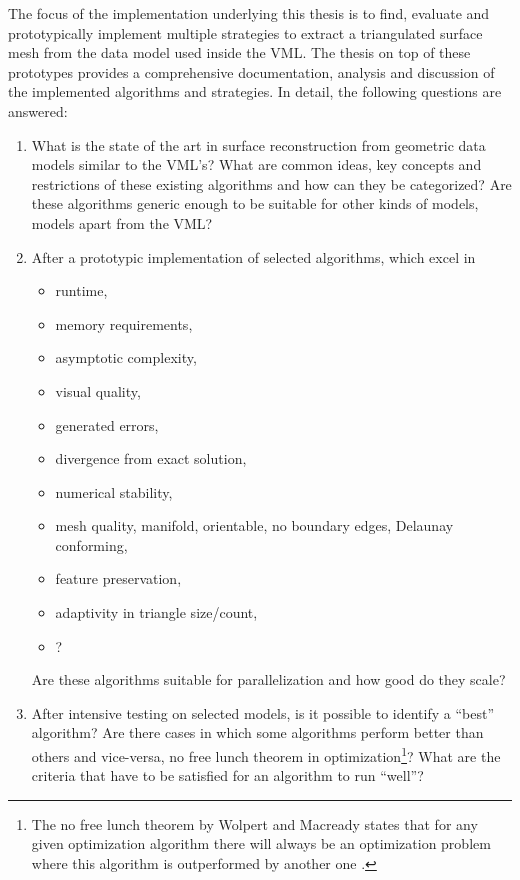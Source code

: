 The focus of the implementation underlying this thesis is to find, evaluate and prototypically implement multiple strategies to extract a triangulated surface mesh from the data model used inside the VML.
The thesis on top of these prototypes provides a comprehensive documentation, analysis and discussion of the implemented algorithms and strategies.
In detail, the following questions are answered:

\begin{enumerate}
	\item What is the state of the art in surface reconstruction from geometric data models similar to the VML's?
	What are common ideas, key concepts and restrictions of these existing algorithms and how can they be categorized?
	Are these algorithms generic enough to be suitable for other kinds of models, \ie models apart from the VML?

	\item After a prototypic implementation of selected algorithms, which excel in
	\begin{itemize}
		\item runtime,
		\item memory requirements,
		\item asymptotic complexity,
		\item visual quality,
		\item generated errors,
		\item divergence from exact solution,
		\item numerical stability,
		\item mesh quality, \eg manifold, orientable, no boundary edges, Delaunay conforming,
		\item feature preservation,
		\item adaptivity in triangle size/count,
		\item \etc?
	\end{itemize}
	Are these algorithms suitable for parallelization and how good do they scale?

	\item After intensive testing on selected models, is it possible to identify a \enquote{best} algorithm?
	Are there cases in which some algorithms perform better than others and vice-versa, \cf no free lunch theorem in optimization\footnote{The no free lunch theorem by Wolpert and Macready states that for any given optimization algorithm there will always be an optimization problem where this algorithm is outperformed by another one \cite{no_free_lunch}.}?
	What are the criteria that have to be satisfied for an algorithm to run \enquote{well}?
\end{enumerate}


